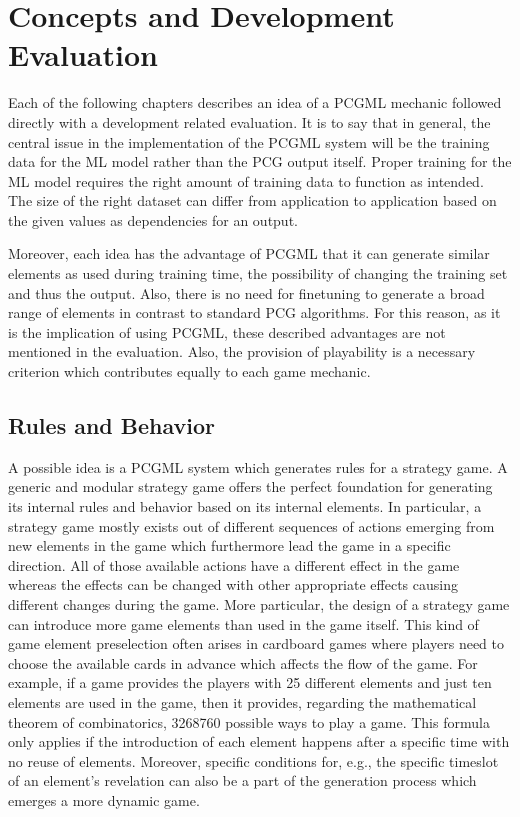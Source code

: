 \documentclass[MGS,Master,english]{twbook}%
\begin{document}
\section{Concepts and Development Evaluation}
Each of the following chapters describes an idea of a PCGML mechanic followed directly with a development related evaluation. It is to say that in general, the central issue in the implementation of the PCGML system will be the training data for the ML model rather than the PCG output itself. Proper training for the ML model requires the right amount of training data to function as intended. The size of the right dataset can differ from application to application based on the given values as dependencies for an output. 

Moreover, each idea has the advantage of PCGML that it can generate similar elements as used during training time, the possibility of changing the training set and thus the output. Also, there is no need for finetuning to generate a broad range of elements in contrast to standard PCG algorithms. For this reason, as it is the implication of using PCGML, these described advantages are not mentioned in the evaluation. Also, the provision of playability is a necessary criterion which contributes equally to each game mechanic.

\subsection{Rules and Behavior} \label{idea::rulesAndBehavior}
A possible idea is a PCGML system which generates rules for a strategy game. A generic and modular strategy game offers the perfect foundation for generating its internal rules and behavior based on its internal elements. In particular, a strategy game mostly exists out of different sequences of actions emerging from new elements in the game which furthermore lead the game in a specific direction. All of those available actions have a different effect in the game whereas the effects can be changed with other appropriate effects causing different changes during the game. More particular, the design of a strategy game can introduce more game elements than used in the game itself. This kind of game element preselection often arises in cardboard games where players need to choose the available cards in advance which affects the flow of the game. For example, if a game provides the players with 25 different elements and just ten elements are used in the game, then it provides, regarding the mathematical theorem of combinatorics, 3268760 possible ways to play a game. This formula only applies if the introduction of each element happens after a specific time with no reuse of elements. Moreover, specific conditions for, e.g., the specific timeslot of an element's revelation can also be a part of the generation process which emerges a more dynamic game.
\end{document}
